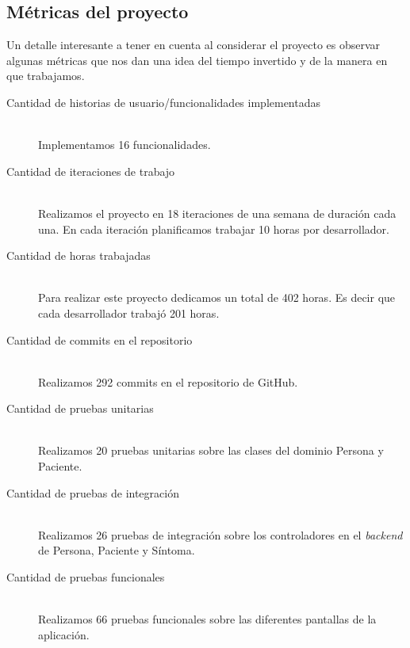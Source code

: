 \subsection{Métricas del proyecto}

Un detalle interesante a tener en cuenta al considerar el proyecto es observar algunas métricas que nos dan una idea del tiempo invertido y de la manera en que trabajamos. 

\begin{description}
\item[Cantidad de historias de usuario/funcionalidades implementadas] \mbox{} \\
Implementamos 16 funcionalidades.

\item[Cantidad de iteraciones de trabajo] \mbox{} \\
Realizamos el proyecto en 18 iteraciones de una semana de duración cada una. En cada iteración planificamos trabajar 10 horas por desarrollador.

\item[Cantidad de horas trabajadas] \mbox{} \\
Para realizar este proyecto dedicamos un total de 402 horas. Es decir que cada desarrollador trabajó 201 horas.

\item[Cantidad de commits en el repositorio] \mbox{} \\
Realizamos 292 commits en el repositorio de GitHub.

\item[Cantidad de pruebas unitarias] \mbox{} \\
Realizamos 20 pruebas unitarias sobre las clases del dominio Persona y Paciente.

\item[Cantidad de pruebas de integración] \mbox{} \\
Realizamos 26 pruebas de integración sobre los controladores en el \textit{backend} de Persona, Paciente y Síntoma.

\item[Cantidad de pruebas funcionales] \mbox{} \\
Realizamos 66 pruebas funcionales sobre las diferentes pantallas de la aplicación.

\end{description}